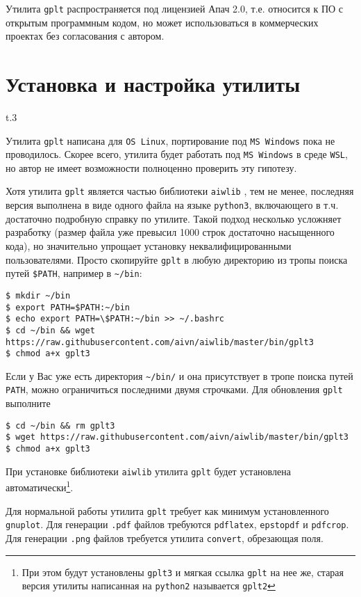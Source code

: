 \documentclass[12pt]{article}
\def\gplt{{\tt gplt}}
\def\gnuplot{{\tt gnuplot}}
\def\python{{\tt python3}}
\def\png{{\tt .png}}
\def\pdf{{\tt .pdf}}
\begin{document}
Утилита \gplt{} распространяется под лицензией Апач 2.0, т.е. относится к ПО с открытым программным кодом, но может использоваться в коммерческих проектах
без согласования с автором.

\section{Установка  и настройка утилиты}
\begin{wrapfigure}{t}{.3\textwidth}
  \vphantom{.}
  \vspace{-3cm}

\end{wrapfigure}
Утилита \gplt{} написана для \verb'OS Linux', портирование под \verb'MS Windows' пока не проводилось. Скорее всего, утилита будет работать
под \verb'MS Windows' в среде \verb'WSL', но автор не имеет возможности полноценно проверить эту гипотезу.

Хотя утилита \gplt{} является частью библиотеки \verb'aiwlib' \cite{aiwlib:SR:PP2018,aiwlib:SV2018,aiwlib:git},
тем не менее, последняя версия выполнена в виде одного файла на языке \python, включающего в т.ч. достаточно подробную справку по утилите.
Такой подход несколько усложняет разработку (размер файла уже превысил 1000 строк достаточно насыщенного кода), но значительно упрощает установку
неквалифицированными пользователями. Просто скопируйте \gplt{} в любую директорию из тропы поиска путей \verb'$PATH', например в \verb'~/bin':
\begin{verbatim}
$ mkdir ~/bin
$ export PATH=$PATH:~/bin
$ echo export PATH=\$PATH:~/bin >> ~/.bashrc
$ cd ~/bin && wget https://raw.githubusercontent.com/aivn/aiwlib/master/bin/gplt3 
$ chmod a+x gplt3
\end{verbatim}
Если у Вас уже есть директория \verb'~/bin/' и она присутствует в тропе поиска путей \verb'PATH', можно ограничиться последними двумя строчками.
Для обновления \gplt{} выполните
\begin{verbatim}
$ cd ~/bin && rm gplt3
$ wget https://raw.githubusercontent.com/aivn/aiwlib/master/bin/gplt3 
$ chmod a+x gplt3
\end{verbatim}

При установке библиотеки \verb'aiwlib' утилита \gplt{} будет установлена автоматически\footnote{При этом будут установлены {\tt gplt3} и мягкая ссылка {\tt gplt} на нее же, старая версия утилиты написанная на {\tt python2} называется {\tt gplt2}}.

Для нормальной работы утилита \gplt{} требует как минимум установленного \gnuplot. Для генерации \pdf{} файлов требуются \verb'pdflatex', \verb'epstopdf'
и \verb'pdfcrop'. Для генерации \png{} файлов требуется утилита \verb'convert', обрезающая поля.
\end{document}
